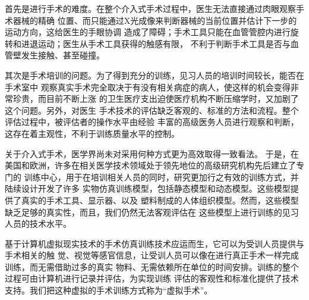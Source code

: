 首先是进行手术的难度。在整个介入式手术过程中，医生无法直接通过肉眼观察手术器械的精确
位置、而只能通过X光成像来判断器械的当前位置并估计下一步的运动方向，这给医生的手眼协调
造成了障碍；手术工具只能在血管管腔内进行旋转和进退运动；医生从手术工具获得的触感有限，
不利于判断手术工具是否与血管壁发生接触、甚至碰撞。

其次是手术培训的问题。为了得到充分的训练，见习人员的培训时间较长，能否在手术室中
观察真实手术完全取决于有没有相关病症的病人，使这样的机会变得非常珍贵，而目前不断上涨
的卫生医疗支出迫使医疗机构不断压缩学时，又加剧了这个问题\cite{liu2003}。另外，对医生
手术技术的评估缺乏客观的、标准的方法和流程。整个评估过程中，被评估者的操作水平由经验
丰富的高级医务人员进行观察和判断，这存在着主观性，不利于训练质量水平的控制\cite{basdogan2007}。

关于介入式手术，医学界尚未对采用何种方式更为高效取得一致看法\cite{basdogan2007}。
于是，在美国和欧洲，许多在相关医学技术领域处于领先地位的高级研究机构先后建立了专门的
训练中心，用于在培训相关人员的同时，研究更加行之有效的训练方式，并陆续设计开发了许多
实物仿真训练模型，包括静态模型和动态模型\cite{Cooper2004Review}。这些模型提供了真实的手术工具、显示器、以及
塑料制成的人体组织模型。然而，这些模型缺乏足够的真实性，而且，我们仍然无法客观评估在
这些模型上进行训练的见习人员的技术水平。

基于计算机虚拟现实技术的手术仿真训练技术应运而生，它可以为受训人员提供与手术相关的触
觉、视觉等感官信息，让受训人员可以像在进行真正手术一样完成训练，而无需借助过多的真实
物料、无需依赖所在单位的时间安排。训练的整个过程可由计算机进行记录并评估，为实现训练
评估的客观性和标准化提供了技术支持。我们把这种虚拟的手术训练方式称为“虚拟手术”。


